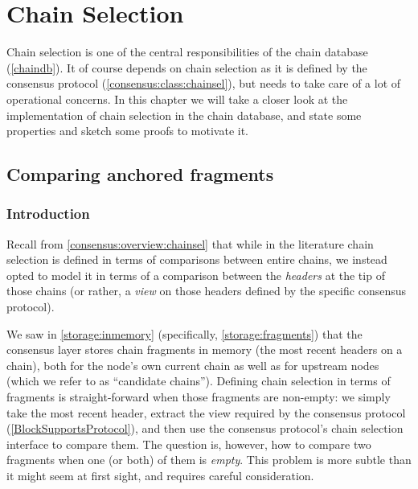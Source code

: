 \newcommand{\chainle}{\ensuremath{\mathrel{\sqsubseteq}}}
\newcommand{\chainlt}{\ensuremath{\mathrel{\sqsubset}}}
\newcommand{\chainnotlt}{\ensuremath{\mathrel{\nsqsubset}}}
\newcommand{\wehave}{.\;}
\newcommand{\suchthat}{.\;}
\newcommand{\app}{\ensuremath{\mathrel{\triangleright}}}
\newcommand{\length}[1]{\ensuremath{\mathrm{length} \; #1}}
\newcommand{\ifthen}[2]{\ensuremath{\mathrm{if} \quad #1 \quad \mathrm{then} \quad #2}}
\renewcommand{\iff}{\ensuremath{\qquad\mathrm{iff}\qquad}}
\newcommand{\candidates}[2]{\ensuremath{\mathsf{candidates}_#1(#2)}}
\newcommand{\blockNo}[1]{\ensuremath{\mathtt{blockNo}(#1)}}
\newcommand{\selectviewle}{\ensuremath{\precsim}}

\chapter{Chain Selection}
\label{chainsel}

Chain selection is one of the central responsibilities of the chain database
(\cref{chaindb}). It of course depends on chain selection as it is defined  by
the consensus protocol (\cref{consensus:class:chainsel}), but needs to  take
care of a lot of operational concerns. In this chapter we will take a closer
look at the implementation of chain selection in the chain database, and state
some properties and sketch some proofs to motivate it.

\section{Comparing anchored fragments}
\label{chainsel:fragments}

\subsection{Introduction}

Recall from \cref{consensus:overview:chainsel} that while in the literature
chain selection is defined in terms of comparisons between entire chains, we
instead opted to model it in terms of a comparison between the \emph{headers} at
the tip of those chains (or rather, a \emph{view} on those headers defined by
the specific consensus protocol).

We saw in \cref{storage:inmemory} (specifically, \cref{storage:fragments}) that
the consensus layer stores chain fragments in memory (the most recent headers on
a chain), both for the node's own current chain as well as for upstream nodes
(which we refer to as ``candidate chains''). Defining chain selection in terms
of fragments is straight-forward when those fragments are non-empty: we simply
take the most recent header, extract the view required by the consensus protocol
(\cref{BlockSupportsProtocol}), and then use the consensus protocol's chain
selection interface to compare them. The question is, however, how to compare
two fragments when one (or both) of them is \emph{empty}. This problem is more
subtle than it might seem at first sight, and requires careful consideration.

